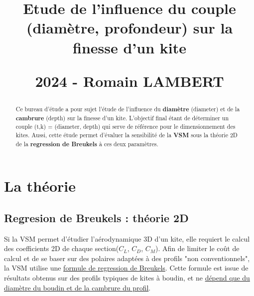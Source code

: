 \documentclass[conference]{IEEEtran}
\begin{document}
\title{\LARGE Etude de l'influence du couple (diamètre, profondeur) sur la finesse d'un kite
\vskip10pt

\small 2024 - Romain LAMBERT
}
\maketitle

\begin{abstract}Ce bureau d'étude a pour sujet l'étude de l'influence du \textbf{diamètre} (diameter) et de la \textbf{cambrure} (depth) sur la finesse d'un kite. L'objectif final étant de déterminer un couple (t,k) = (diameter, depth) qui serve de référence pour le dimensionnement des kites. Aussi, cette étude permet d'évaluer la sensibilité de la \textbf{VSM} sous la théorie 2D de la \textbf{regression de Breukels} à ces deux paramètres.
\end{abstract}
\IEEEoverridecommandlockouts

\IEEEpeerreviewmaketitle
\section{La théorie}

\subsection{\textbf{Regresion de Breukels : théorie 2D}} 

Si la VSM permet d'étudier l'aérodynamique 3D d'un kite, elle requiert le calcul des coefficients 2D de chaque section($C_L$, $C_D$, $C_M$). Afin de limiter le coût de calcul et de se baser sur des polaires adaptées à des profils "non conventionnels", la VSM utilise une \underline{formule de regression de Breukels}. 
Cette formule est issue de résultats obtenus sur des profils typiques de kites à boudin, et ne \underline{dépend que du diamètre du boudin et de la cambrure du profil}. \\
\end{document}
